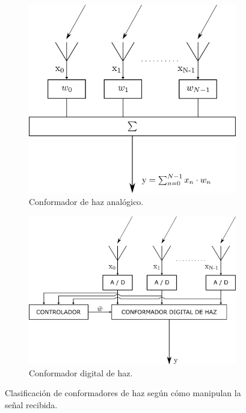 \begin{figure}
    \centering
    \begin{subfigure}[b]{0.7\textwidth}
        \centering
        \includegraphics[width=\linewidth]{images/02-Beamforming/analogbeamformer.png}
        \caption{Conformador de haz analógico.}
        \label{fig:beamforming_analogbeamformer}
    \end{subfigure}
    \hfill
    \begin{subfigure}[b]{0.8\textwidth}
        \centering
        \includegraphics[width=\linewidth]{images/02-Beamforming/digitalbeamformer.png}
        \caption{Conformador digital de haz.}
        \label{fig:beamforming_digitalbeamformer}
    \end{subfigure}
    \caption{Clasificación de conformadores de haz según cómo manipulan la señal recibida.}
\end{figure}

